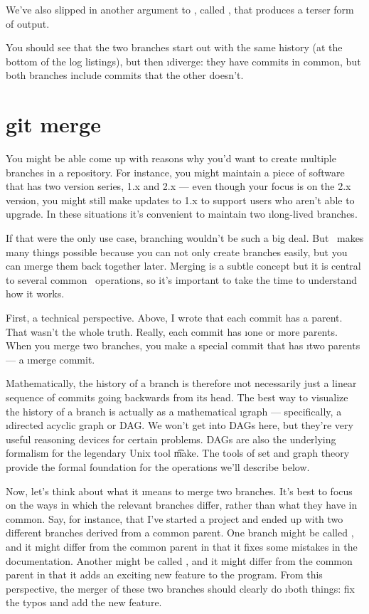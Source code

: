 \documentclass[letterpaper, 12pt, titlepage, twoside]{article}
\begin{document}
We've also slipped in another argument to , called ,
that produces a terser form of output.

You should see that the two branches start out with the same history (at the
bottom of the log listings), but then \i{diverge}: they have commits in
common, but both branches include commits that the other doesn't.


\section{git merge}

You might be able come up with reasons why you'd want to create multiple
branches in a repository. For instance, you might maintain a piece of software
that has two version series, 1.x and 2.x --- even though your focus is on the
2.x version, you might still make updates to 1.x to support users who aren't
able to upgrade. In these situations it's convenient to maintain two
\i{long-lived branches}.

If that were the only use case, branching wouldn't be such a big deal. But
\git\ makes many things possible because you can not only create branches
easily, but you can \i{merge} them back together later. Merging is a subtle
concept but it is central to several common \git\ operations, so it's
important to take the time to understand how it works.

First, a technical perspective. Above, I wrote that each commit has a parent.
That wasn't the whole truth. Really, each commit has \i{one or more parents}.
When you merge two branches, you make a special commit that has \i{two}
parents --- a \i{merge commit}.

Mathematically, the history of a branch is therefore \i{not} necessarily just
a linear sequence of commits going backwards from its head. The best way to
visualize the history of a branch is actually as a mathematical \i{graph} ---
specifically, a \i{directed acyclic graph} or DAG. We won't get into DAGs
here, but they're very useful reasoning devices for certain problems. DAGs are
also the underlying formalism for the legendary Unix tool \t{make}. The tools
of set and graph theory provide the formal foundation for the operations we'll
describe below.

Now, let's think about what it \i{means} to merge two branches. It's best to
focus on the ways in which the relevant branches differ, rather than what they
have in common. Say, for instance, that I've started a project and ended up
with two different branches derived from a common parent. One branch might be
called , and it might differ from the common parent in that it
fixes some mistakes in the documentation. Another might be called
, and it might differ from the common parent in that it adds an
exciting new feature to the program. From this perspective, the merger of
these two branches should clearly do \i{both} things: fix the typos \i{and}
add the new feature.
\end{document}
